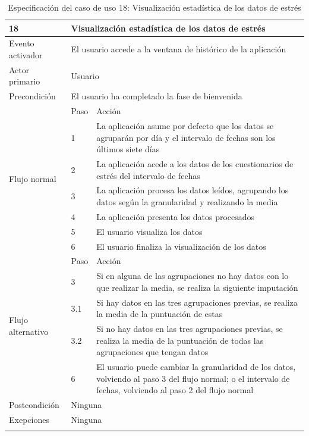     \begin{table}[h]
        \centering
        \begin{tabularx}{\textwidth}{|l|l|X|}
            \hline
            18 & \multicolumn{2}{|X|}{Visualización estadística de los datos de estrés} \\
            \hline
            Evento activador & \multicolumn{2}{|X|}{El usuario accede a la ventana de histórico de la aplicación} \\
            \hline
            Actor primario & \multicolumn{2}{|X|}{Usuario} \\
            \hline
            Precondición & \multicolumn{2}{|X|}{El usuario ha completado la fase de bienvenida} \\
            \hline
            \multirow{7}{*}{Flujo normal} & Paso & Acción \\
            \cline{2-3} & 1 & La aplicación asume por defecto que los datos se agruparán por día y el intervalo de fechas son los últimos siete días \\
            \cline{2-3} & 2 & La aplicación acede a los datos de los cuestionarios de estrés del intervalo de fechas \\
            \cline{2-3} & 3 & La aplicación procesa los datos leídos, agrupando los datos según la granularidad y realizando la media \\
            \cline{2-3} & 4 & La aplicación presenta los datos procesados \\
            \cline{2-3} & 5 & El usuario visualiza los datos \\
            \cline{2-3} & 6 & El usuario finaliza la visualización de los datos \\
            \hline
            \multirow{5}{*}{Flujo alternativo} & Paso & Acción \\
            \cline{2-3} & 3 & Si en alguna de las agrupaciones no hay datos con lo que realizar la media, se realiza la siguiente imputación \\
            \cline{2-3} & 3.1 & Si hay datos en las tres agrupaciones previas, se realiza la media de la puntuación de estas \\
            \cline{2-3} & 3.2 & Si no hay datos en las tres agrupaciones previas, se realiza la media de la puntuación de todas las agrupaciones que tengan datos \\
            \cline{2-3} & 6 & El usuario puede cambiar la granularidad de los datos, volviendo al paso 3 del flujo normal; o el intervalo de fechas, volviendo al paso 2 del flujo normal \\
            \hline
            Postcondición & \multicolumn{2}{|X|}{Ninguna} \\
            \hline
            Exepciones & \multicolumn{2}{|X|}{Ninguna} \\
            \hline
            \caption{Especificación del caso de uso 18: Visualización estadística de los datos de estrés}
            \label{tabla:casos_uso:visualizacion_estadistica_estres}
        \end{tabularx}
    \end{table}

